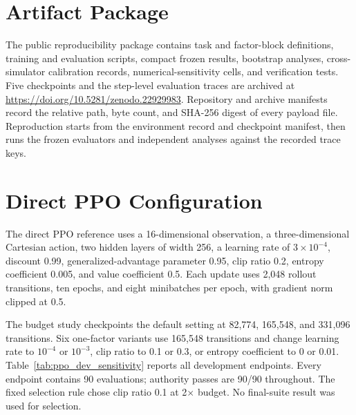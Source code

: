 \useRomanappendicesfalse
\appendices
\section{Artifact Package}
\label{app:artifact_package}

The public reproducibility package contains task and factor-block definitions,
training and evaluation scripts, compact frozen results, bootstrap analyses,
cross-simulator calibration records, numerical-sensitivity cells, and
verification tests. Five checkpoints and the step-level evaluation traces are
archived at \url{https://doi.org/10.5281/zenodo.22929983}. Repository and archive
manifests record the relative path, byte count, and SHA-256 digest of every
payload file. Reproduction starts from the environment record and checkpoint
manifest, then runs the frozen evaluators and independent analyses against the
recorded trace keys.

\section{Direct PPO Configuration}
\label{app:ppo_configuration}

The direct PPO reference uses a 16-dimensional observation, a
three-dimensional Cartesian action, two hidden layers of width 256, a
learning rate of $3\times10^{-4}$, discount 0.99, generalized-advantage
parameter 0.95, clip ratio 0.2, entropy coefficient 0.005, and value
coefficient 0.5. Each update uses 2,048 rollout transitions, ten epochs, and
eight minibatches per epoch, with gradient norm clipped at 0.5.

The budget study checkpoints the default setting at 82,774, 165,548, and
331,096 transitions. Six one-factor variants use 165,548 transitions and
change learning rate to $10^{-4}$ or $10^{-3}$, clip ratio to 0.1 or 0.3, or
entropy coefficient to 0 or 0.01. Table~\ref{tab:ppo_dev_sensitivity} reports
all development endpoints. Every endpoint contains 90 evaluations; authority
passes are 90/90 throughout. The fixed selection rule chose clip ratio 0.1 at
2$\times$ budget. No final-suite result was used for selection.

